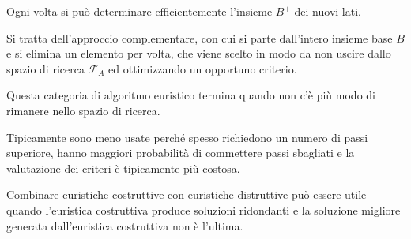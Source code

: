 \documentclass[\main/main.tex]{subfiles}
\providecommand{\f}{\mathcal{F}}
\providecommand{\fa}{\f_A}
\begin{document}
\begin{multicols}{2}
\begin{definition}
    Ogni volta si può determinare efficientemente l'insieme \(B^+\) dei nuovi lati.
\end{definition}

\begin{definition}
    Si tratta dell'approccio complementare, con cui si parte dall'intero insieme base \(B\) e si elimina un elemento per volta, che viene scelto in modo da non uscire dallo spazio di ricerca \(\fa\) ed ottimizzando un opportuno criterio.
\end{definition}
\begin{observation}
    Questa categoria di algoritmo euristico termina quando non c'è più modo di rimanere nello spazio di ricerca.
\end{observation}
\begin{observation}
    Tipicamente sono meno usate perché spesso richiedono un numero di passi superiore, hanno maggiori probabilità di commettere passi sbagliati e la valutazione dei criteri è tipicamente più costosa.
\end{observation}
\begin{observation}
    Combinare euristiche costruttive con euristiche distruttive può essere utile quando l'euristica costruttiva produce soluzioni ridondanti e la soluzione migliore generata dall'euristica costruttiva non è l'ultima.
\end{observation}
\end{multicols}
\end{document}
